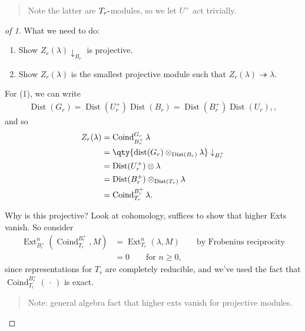 \begin{quote}
Note the latter are \(T_r{\hbox{-}}\)modules, so we let \(U^+\) act
trivially.
\end{quote}

\begin{proof}[of 1]

What we need to do:

\begin{enumerate}
\def\labelenumi{\arabic{enumi}.}
\tightlist
\item
  Show \(Z_r(\lambda)\downarrow_{B_r}\) is projective.
\item
  Show \(Z_r(\lambda)\) is the smallest projective module such that
  \(Z_r(\lambda) \twoheadrightarrow\lambda\).
\end{enumerate}

For (1), we can write
\begin{align*}
\operatorname{Dist}(G_r) = \operatorname{Dist}(U_r^+) \operatorname{Dist}(B_r) = \operatorname{Dist}(B_r^+) \operatorname{Dist}(U_r),
,\end{align*}
and so
\begin{align*}  
Z_r(\lambda) 
&= \operatorname{Coind}_{B_r^+}^{G_r} \lambda \\
&= \qty{\operatorname{dist}(G_r) \otimes_{\operatorname{Dist}(B_r)} \lambda} \downarrow_{B_r^+} \\
&= \operatorname{Dist}(U_r^+)\otimes\lambda \\
&= \operatorname{Dist}(B_r^+) \otimes_{\operatorname{Dist}(T_r)} \lambda \\
&= \operatorname{Coind}_{T_r}^{B_r^+} \lambda
.\end{align*}

Why is this projective? Look at cohomology, suffices to show that higher
Exts vanish. So consider
\begin{align*}  
\operatorname{Ext}_{B_r^+}^n(\operatorname{Coind}_{T_r}^{B_r^+}, M) 
&= \operatorname{Ext}_{T_r}^n (\lambda, M) \qquad\text{by Frobenius reciprocity} \\
&= 0 \qquad \text{for } n \geq 0
,\end{align*}
since representations for \(T_r\) are completely reducible, and we've
used the fact that \(\operatorname{Coind}_{T_r}^{B_r^+}({\,\cdot\,})\)
is exact.

\begin{quote}
Note: general algebra fact that higher exts vanish for projective
modules.
\end{quote}


\end{proof}
